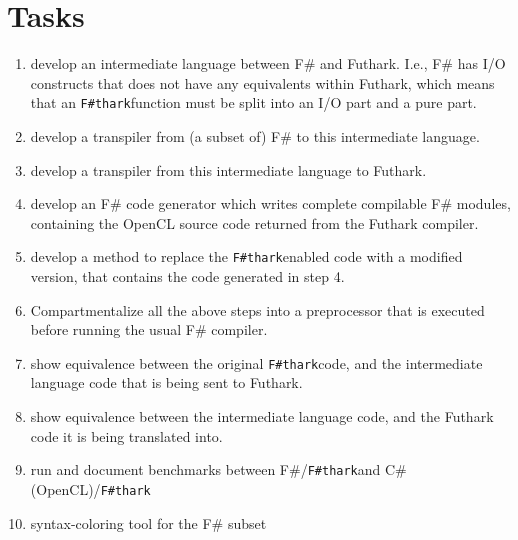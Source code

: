 \documentclass{article}
\newcommand{\fshark}{\texttt{F\#thark}}
\begin{document}
\section{Tasks}
\begin{enumerate}
    \item develop an intermediate language between F\# and Futhark.
    I.e., F\# has I/O constructs that does not have any equivalents within 
    Futhark, which means that an \fshark function must be split into an I/O part
    and a pure part.

    \item develop a transpiler from (a subset of) F\# to this intermediate
    language.

    \item develop a transpiler from this intermediate language to Futhark.

    \item develop an F\# code generator which writes complete compilable F\#
    modules, containing the OpenCL source code returned from the Futhark 
    compiler.

    \item develop a method to replace the \fshark enabled code with a modified 
    version, that contains the code generated in step 4.
    
    \item Compartmentalize all the above steps into a preprocessor
    that is executed before running the usual F\# compiler.
    
    \item show equivalence between the original \fshark code, and the 
    intermediate language code that is being sent to Futhark.

    \item show equivalence between the intermediate language code,
    and the Futhark code it is being translated into.

    \item run and document benchmarks between F\#/\fshark and 
    C\# (OpenCL)/\fshark 

    \item syntax-coloring tool for the F\# subset
\end{enumerate}
\end{document}
